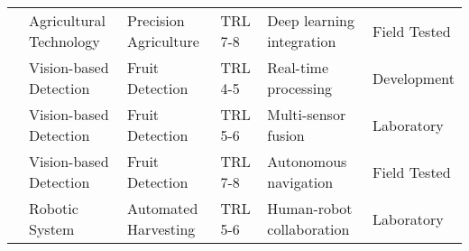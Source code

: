 \begin{table*}[htbp]
\begin{tabular}{@{}p{}p{}p{}p{}p{}p{}@{}}
\cite{agricultural_robotics_2020} & Agricultural Technology & Precision Agriculture & TRL 7-8 & Deep learning integration & Field Tested \\
\cite{vision_system_2019} & Vision-based Detection & Fruit Detection & TRL 4-5 & Real-time processing & Development \\
\cite{agricultural_robotics_2020} & Vision-based Detection & Fruit Detection & TRL 5-6 & Multi-sensor fusion & Laboratory \\
\cite{agricultural_robotics_2020} & Vision-based Detection & Fruit Detection & TRL 7-8 & Autonomous navigation & Field Tested \\
\cite{tomato_harvest_2021} & Robotic System & Automated Harvesting & TRL 5-6 & Human-robot collaboration & Laboratory \\
\bottomrule
\end{tabular}
\end{table*}